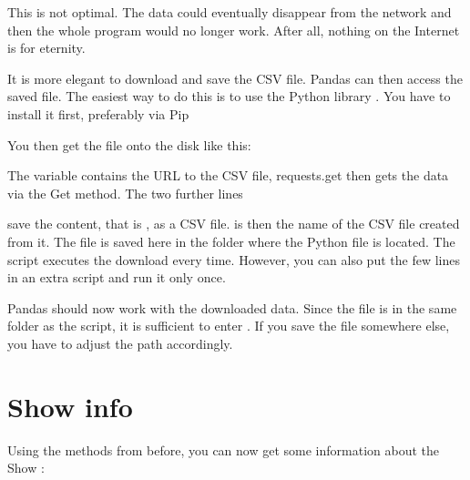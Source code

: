 \medskip

This is not optimal. The data could eventually disappear from the network and then the whole program would no longer work. After all, nothing on the Internet is for eternity.

It is more elegant to download and save the CSV file. Pandas can then access the saved file. The easiest way to do this is to use the Python library . You have to install it first, preferably via Pip


You then get the file onto the disk like this:




The variable  contains the URL to the CSV file, requests.get  then gets the data via the Get method. The two further lines

save the content, that is , as a CSV file.  is then the name of the CSV file created from it. The file is saved here in the folder where the Python file is located. The script executes the download every time. However, you can also put the few lines in an extra script and run it only once.

Pandas should now work with the downloaded data. Since the file is in the same folder as the script, it is sufficient to enter . If you save the file somewhere else, you have to adjust the path accordingly.







\section{Show info}

Using the methods from before, you can now get some information about the Show :




